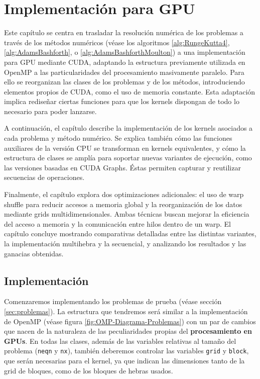 \chapter{Implementación para GPU}

Este capítulo se centra en trasladar la resolución numérica de los problemas a través de los métodos numéricos (véase los algoritmos \ref{alg:RungeKutta4}, \ref{alg:AdamsBashforth}, o \ref{alg:AdamsBashforthMoulton}) a una implementación para GPU mediante CUDA, adaptando la estructura previamente utilizada en OpenMP a las particularidades del procesamiento masivamente paralelo. Para ello se reorganizan las clases de los problemas y de los métodos, introduciendo elementos propios de CUDA, como el uso de memoria constante. Esta adaptación implica rediseñar ciertas funciones para que los kernels dispongan de todo lo necesario para poder lanzarse.

A continuación, el capítulo describe la implementación de los kernels asociados a cada problema y método numérico. Se explica también cómo las funciones auxiliares de la versión CPU se transforman en kernels equivalentes, y cómo la estructura de clases se amplía para soportar nuevas variantes de ejecución, como las versiones basadas en CUDA Graphs. Éstas permiten capturar y reutilizar secuencias de operaciones.

Finalmente, el capítulo explora dos optimizaciones adicionales: el uso de warp shuffle para reducir accesos a memoria global y la reorganización de los datos mediante grids multidimensionales. Ambas técnicas buscan mejorar la eficiencia del acceso a memoria y la comunicación entre hilos dentro de un warp. El capítulo concluye mostrando comparativas detalladas entre las distintas variantes, la implementación multihebra y la secuencial, y analizando los resultados y las ganacias obtenidas.

\section{Implementación}

Comenzaremos implementando los problemas de prueba (véase sección \ref{sec:problemas}). La estructura que tendremos será similar a la implementación de Open\-MP (véase figura \ref{fig:OMP-Diagrama-Problemas}) con un par de cambios que nacen de la naturaleza de las peculiaridades propias del \textbf{procesamiento en GPUs}. En todas las clases, además de las variables relativas al tamaño del problema (\texttt{neqn} y \texttt{nx}), también deberemos controlar las variables \texttt{grid} y \texttt{block}, que serán necesarias para el kernel, ya que indican las dimensiones tanto de la grid de bloques, como de los bloques de hebras usados.

